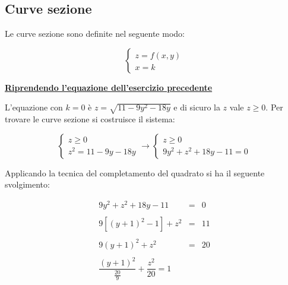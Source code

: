 \documentclass[a4paper]{article}
\begin{document}
	\newpage
	
	\subsection{Curve sezione}
	
	Le curve sezione sono definite nel seguente modo:
	
	\begin{equation*}
		\begin{cases}
			z = f\left(x,y\right) \\
			x = k
		\end{cases}
	\end{equation*}

	\noindent
	\textcolor{Red3}{\textbf{\underline{Riprendendo l'equazione dell'esercizio precedente}}}\newline
	
	\noindent
	L'equazione con $k = 0$ è $z = \sqrt{11 - 9y^{2} - 18y}$ e di sicuro la $z$ vale $z \ge 0$. Per trovare le curve sezione si costruisce il sistema:
	
	\begin{equation*}
		\begin{cases}
			z \ge 0 \\
			z^{2} = 11 - 9y - 18y
		\end{cases}
		\longrightarrow
		\begin{cases}
			z \ge 0 \\
			9y^{2} + z^{2} + 18y - 11 = 0
		\end{cases}
	\end{equation*}
	
	\noindent
	Applicando la tecnica del completamento del quadrato si ha il seguente svolgimento:
	
	\begin{equation*}
		\begin{array}{rll}
			9y^{2} + z^{2} + 18y - 11 						& = &  0 \\
			&& \\
			9\left[\left(y+1\right)^{2} - 1\right] + z^{2}	& =	& 11 \\
			&& \\
			9\left(y+1\right)^{2} + z^{2}					& = & 20 \\
			&& \\
			\dfrac{\left(y+1\right)^{2}}{\frac{20}{9}} + \dfrac{z^{2}}{20} = 1
		\end{array}
	\end{equation*}

	\newpage
	
\end{document}
